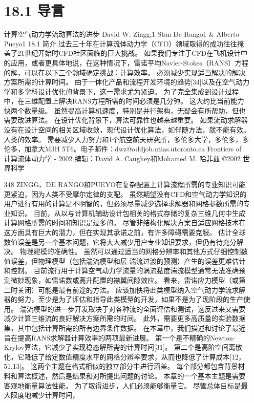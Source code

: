 \documentclass[UTF8,11pt,a4paper,openany,fontset=fandol]{ctexbook}
\begin{document}
\section{18.1 导言}
计算空气动力学流动算法的进步 David W. Zingg,1 Stan De Rango1 \& Alberto Pueyo1 18.1 简介 过去三十年在计算流体动力学（CFD）领域取得的成功往往掩盖了21世纪开始时CFD社区面临的巨大挑战。 如果我们专注于CFD在飞机设计中的应用，或者更具体地说，在这种情况下，雷诺平均Navier-Stokes（RANS）方程的解，可以在以下三个领域确定挑战：计算效率。 必须减少实现适当解决的解决方案所需的计算时间。 由于一体化产品和流程开发环境的趋势[34]以及在空气动力学和多学科设计优化的背景下，这一需求尤为紧迫。 为了完全集成到设计过程中，在三维配置上解决RANS方程所需的时间必须是几分钟。 这大约比当前能力快两个数量级。 虽然提高计算机速度，特别是并行架构，无疑会有所帮助，但也需要改进算法。 在设计优化背景下，算法可靠性也越来越重要。 如果流动求解器没有在设计空间的相关区域收敛，现代设计优化算法，如伴随方法，就不能有效。 人类的效率。 需要减少人力努力和1个航空航天研究所，多伦多大学，多伦多，多伦多，加拿大M3H 5T6。电子邮件：dwz@oddjob.utias.utoronto.ca Frontiers of 计算流体动力学 - 2002 编辑：David A. Caughey和Mohamed M. 哈菲兹 ©2002 世界科学

348 ZINGG、DE RANGO和PUEYO在复杂配置上计算流程所需的专业知识可能更紧迫，因为人类不受摩尔定律的支配。 虽然期望没有CFD和空气动力学知识的用户进行有用的计算是不明智的，但必须尽量减少选择求解器和网格参数所需的专业知识。 目前，从以与计算机辅助设计包相关的格式存储的复杂三维几何中生成计算网格所需的时间和知识是过多的。 尽管非结构化解决方案自适应网格技术在这方面具有巨大的潜力，但在实现其承诺之前，有许多障碍需要克服。 估计全球数值误差是另一个基本问题，它将大大减少用户专业知识要求，但仍有待充分解决。 物理建模的准确性。 虽然可以通过适当的网格分辨率和其他方式仔细控制数值误差，但物理模型（包括湍流模型和层-湍流过渡的预测）产生的误差更难估计和控制。 目前流行用于计算空气动力学流量的涡流黏度湍流模型通常无法准确预测微妙现象，如雷诺数或高升配置的襟翼间隙效应。 看来，雷诺应力模型（或第二时关闭）可能是最有前途的方法。 应该加快将此类模型纳入空气动力学流求解器的努力，至少是为了评估和指导此类模型的开发，如果不是为了现阶段的生产使用。 湍流模型的进一步开发取决于对各种流的全面评估和测试，这反过来又需要减少计算三维流的良好解决方案所需的时间。 此外，需要更多高质量的实验数据集，其中包括计算所需的所有边界条件数据。 在本章中，我们描述和讨论了最近旨在提高RANS求解器计算效率的两项最新进展。 第一个是不精确的Newton-Krylov算法，它减少了实现稳态解所需的计算时间[31]。 第二个是高阶空间离散化，它降低了给定数值精度水平的网格分辨率要求，从而也降低了计算成本[12，51,13]。 这两个主题在格式相似的独立部分中进行涵盖。 每个部分都包含背景材料和算法概述，然后是结果和对所提出问题的讨论。 本章的一个基本主题是需要客观地衡量算法性能。 为了取得进步，人们必须能够衡量它。 尽管总体目标是最大限度地减少计算时间，
\end{document}

